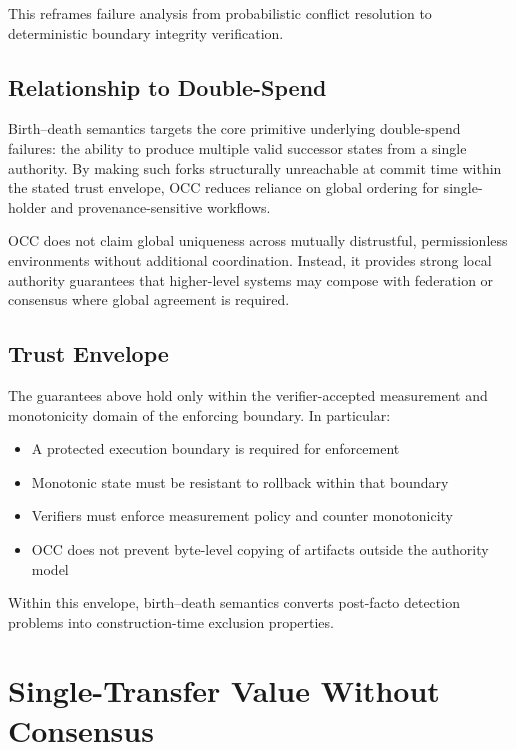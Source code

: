 \documentclass[11pt,letterpaper]{article}
\theoremstyle{occplain}
\theoremstyle{occremark}
\begin{document}
This reframes failure analysis from probabilistic conflict resolution to deterministic boundary integrity verification.


\subsection{Relationship to Double-Spend}
\label{sec:bd-double-spend}

Birth--death semantics targets the core primitive underlying double-spend failures: the ability to produce multiple valid successor states from a single authority. By making such forks structurally unreachable at commit time within the stated trust envelope, OCC reduces reliance on global ordering for single-holder and provenance-sensitive workflows.

OCC does not claim global uniqueness across mutually distrustful, permissionless environments without additional coordination. Instead, it provides strong local authority guarantees that higher-level systems may compose with federation or consensus where global agreement is required.


\subsection{Trust Envelope}
\label{sec:bd-trust-envelope}

The guarantees above hold only within the verifier-accepted measurement and monotonicity domain of the enforcing boundary. In particular:
\begin{itemize}
  \item A protected execution boundary is required for enforcement
  \item Monotonic state must be resistant to rollback within that boundary
  \item Verifiers must enforce measurement policy and counter monotonicity
  \item OCC does not prevent byte-level copying of artifacts outside the authority model
\end{itemize}

Within this envelope, birth--death semantics converts post-facto detection problems into construction-time exclusion properties.


\section{Single-Transfer Value Without Consensus}
\label{sec:value-transfer}
\end{document}
